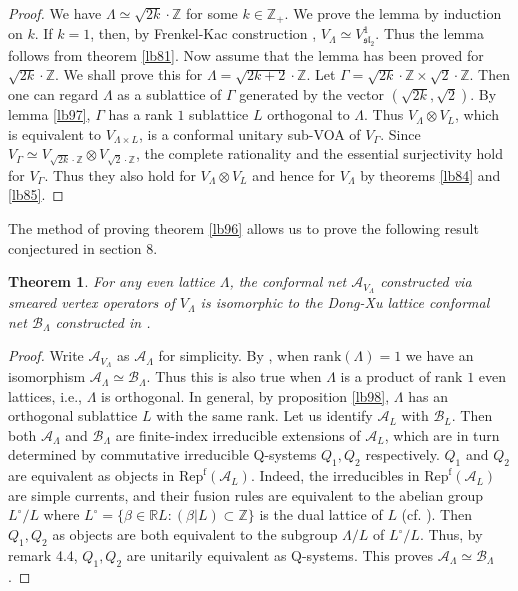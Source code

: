 \documentclass[11pt,b5paper,notitlepage]{article}
\theoremstyle{definition}
\theoremstyle{plain}
\newtheorem{thm}[df]{Theorem}
\newcommand{\fk}{\mathfrak}
\newcommand{\mc}{\mathcal}
\newcommand{\Repf}{\mathrm{Rep}^{\mathrm f}}
\newcommand{\mbb}{\mathbb}
\newcommand{\rank}{\mathrm{rank}}
\numberwithin{equation}{subsection}
\begin{document}
\begin{proof}
We have $\Lambda\simeq \sqrt {2k}\cdot \mbb Z$ for some $k\in\mbb Z_+$. We prove the lemma by induction on $k$. If $k=1$, then, by Frenkel-Kac construction \cite{FK80}, $V_\Lambda\simeq V^1_{\fk{sl}_2}$. Thus the lemma follows from theorem \ref{lb81}. Now assume that the lemma has been proved for $\sqrt {2k}\cdot \mbb Z$. We shall prove this for $\Lambda=\sqrt {2k+2}\cdot\mbb Z$. Let $\Gamma=\sqrt {2k}\cdot\mbb Z\times \sqrt 2\cdot \mbb Z$. Then one can regard $\Lambda$ as a sublattice of $\Gamma$ generated by the vector $(\sqrt{2k},\sqrt 2)$. By lemma \ref{lb97}, $\Gamma$ has a rank $1$ sublattice $L$ orthogonal to $\Lambda$. Thus  $V_\Lambda\otimes V_L$, which is equivalent to $V_{\Lambda\times L}$, is a conformal unitary sub-VOA of $V_\Gamma$. Since $V_\Gamma\simeq V_{\sqrt{2k}\cdot\mbb Z}\otimes V_{\sqrt 2\cdot\mbb Z}$, the complete rationality and the essential surjectivity hold for $V_\Gamma$. Thus they also hold for $V_\Lambda\otimes V_L$ and hence for $V_\Lambda$ by theorems \ref{lb84} and \ref{lb85}.
\end{proof}





The method of proving theorem \ref{lb96} allows us to prove the following result conjectured in \cite{CKLW18} section 8.

\begin{thm}
For any even lattice $\Lambda$, the conformal net $\mc A_{V_\Lambda}$ constructed via smeared vertex operators of $V_\Lambda$ is isomorphic to the Dong-Xu lattice conformal  net $\mc B_\Lambda$ constructed in \cite{DX06}.
\end{thm}


\begin{proof}
Write $\mc A_{V_\Lambda}$ as $\mc A_\Lambda$ for simplicity. By \cite{BMT88}, when $\rank(\Lambda)=1$ we have an isomorphism $\mc A_\Lambda\simeq \mc B_\Lambda$. Thus this is also true when $\Lambda$ is a product of rank $1$ even lattices, i.e., $\Lambda$ is orthogonal. In general, by proposition \ref{lb98}, $\Lambda$ has an orthogonal sublattice $L$ with the same rank. Let us identify $\mc A_L$ with $\mc B_L$. Then both $\mc A_\Lambda$ and $\mc B_\Lambda$ are finite-index irreducible extensions of $\mc A_L$, which are in turn determined by  commutative irreducible Q-systems $Q_1,Q_2$ respectively. $Q_1$ and $Q_2$ are equivalent as objects in $\Repf(\mc A_L)$. Indeed, the irreducibles in $\Repf(\mc A_L)$ are simple currents, and their fusion rules are equivalent to the abelian group $L^\circ/L$ where $L^\circ=\{\beta\in\mbb RL:(\beta|L)\subset\mbb Z \}$ is the dual lattice of $L$ (cf. \cite{DX06}). Then $Q_1,Q_2$ as objects are both equivalent to the subgroup $\Lambda/L$ of $L^\circ/L$. Thus,  by \cite{KL06} remark 4.4, $Q_1,Q_2$ are unitarily equivalent as Q-systems. This proves $\mc A_\Lambda\simeq\mc B_\Lambda$.
\end{proof}
\end{document}
